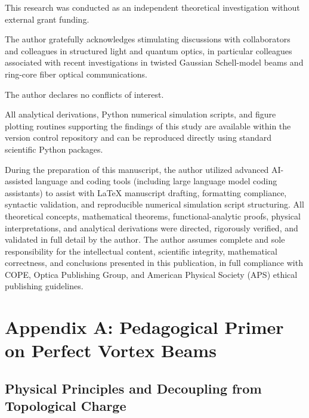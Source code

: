 \documentclass{optica-article}
\begin{document}
\begin{backmatter}

This research was conducted as an independent theoretical investigation without external grant funding.

The author gratefully acknowledges stimulating discussions with collaborators and colleagues in structured light and quantum optics, in particular colleagues associated with recent investigations in twisted Gaussian Schell-model beams and ring-core fiber optical communications.

The author declares no conflicts of interest.

All analytical derivations, Python numerical simulation scripts, and figure plotting routines supporting the findings of this study are available within the version control repository and can be reproduced directly using standard scientific Python packages.

During the preparation of this manuscript, the author utilized advanced AI-assisted language and coding tools (including large language model coding assistants) to assist with LaTeX manuscript drafting, formatting compliance, syntactic validation, and reproducible numerical simulation script structuring. All theoretical concepts, mathematical theorems, functional-analytic proofs, physical interpretations, and analytical derivations were directed, rigorously verified, and validated in full detail by the author. The author assumes complete and sole responsibility for the intellectual content, scientific integrity, mathematical correctness, and conclusions presented in this publication, in full compliance with COPE, Optica Publishing Group, and American Physical Society (APS) ethical publishing guidelines.

\end{backmatter}


\appendix

\section{Appendix A: Pedagogical Primer on Perfect Vortex Beams}
\label{app:primer}

\subsection{Physical Principles and Decoupling from Topological Charge}
\end{document}
